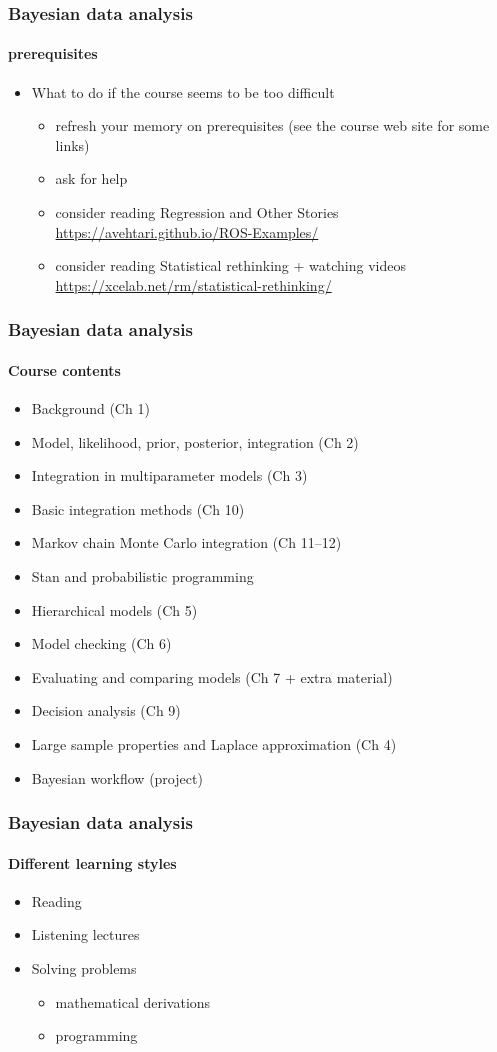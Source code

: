 \documentclass[english,t]{beamer}
\begin{document}
\begin{frame}
  \frametitle{Bayesian data analysis}  %
  \framesubtitle{prerequisites}
  \begin{itemize}
  \item What to do if the course seems to be too difficult
    \begin{itemize}
    \item refresh your memory on prerequisites (see the course web
      site for some links)
    \item ask for help
    \item consider reading Regression and Other Stories \url{https://avehtari.github.io/ROS-Examples/}
    \item consider reading Statistical rethinking + watching videos \url{https://xcelab.net/rm/statistical-rethinking/}
    \end{itemize}
  \end{itemize}

\end{frame}

\begin{frame}
  \frametitle{Bayesian data analysis}  %
  \framesubtitle{Course contents}
  \begin{itemize}
  \item Background (Ch 1)
  \item Model, likelihood, prior, posterior, integration (Ch 2)
  \item Integration in multiparameter models (Ch 3)
  \item Basic integration methods (Ch 10)
  \item Markov chain Monte Carlo integration (Ch 11--12)
  \item Stan and probabilistic programming
  \item Hierarchical models (Ch 5)
  \item Model checking (Ch 6)
  \item Evaluating and comparing models (Ch 7 + extra material)
  \item Decision analysis (Ch 9)
  \item Large sample properties and Laplace approximation (Ch 4)
  \item Bayesian workflow (project)
  \end{itemize}
  
\end{frame}


\begin{frame}
  \frametitle{Bayesian data analysis}  %
  \framesubtitle{Different learning styles}

  \begin{itemize}
  \item Reading
  \item Listening lectures
  \item Solving problems
    \begin{itemize}
    \item mathematical derivations
    \item programming
    \end{itemize}
  \end{itemize}
  
\end{frame}
\end{document}
